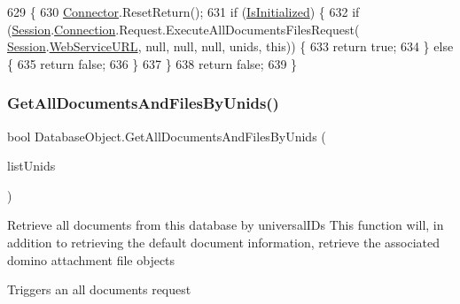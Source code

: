 \begin{DoxyCode}
629                                                              \{
630         \mbox{\hyperlink{class_connector}{Connector}}.ResetReturn();
631         \textcolor{keywordflow}{if} (\mbox{\hyperlink{class_database_object_a5fe036d32a30eb10d1b3f6a30263f740}{IsInitialized}}) \{
632             \textcolor{keywordflow}{if} (\mbox{\hyperlink{class_database_object_aa8484162b7d2a7c4c9426bca13c64c07}{Session}}.\mbox{\hyperlink{class_session_object_a014bdbf705a753540e19bfb53030c55c}{Connection}}.Request.ExecuteAllDocumentsFilesRequest(
      \mbox{\hyperlink{class_database_object_aa8484162b7d2a7c4c9426bca13c64c07}{Session}}.\mbox{\hyperlink{class_session_object_a697c071c812fbf7ad1166b896fb44c16}{WebServiceURL}}, null, null, null, unids, \textcolor{keyword}{this})) \{
633                 \textcolor{keywordflow}{return} \textcolor{keyword}{true};
634             \} \textcolor{keywordflow}{else} \{
635                 \textcolor{keywordflow}{return} \textcolor{keyword}{false};
636             \}
637         \}
638         \textcolor{keywordflow}{return} \textcolor{keyword}{false};
639     \}
\end{DoxyCode}
\mbox{\label{class_database_object_aa69262a50977a28a2decf400d1eedd20}} 
\subsubsection{\texorpdfstring{Get\+All\+Documents\+And\+Files\+By\+Unids()}{GetAllDocumentsAndFilesByUnids()}\hspace{0.1cm}{\footnotesize\ttfamily [2/2]}}
{\footnotesize\ttfamily bool Database\+Object.\+Get\+All\+Documents\+And\+Files\+By\+Unids (\begin{DoxyParamCaption}\item[{I\+List}]{list\+Unids }\end{DoxyParamCaption})}



Retrieve all documents from this database by universal\+I\+Ds This function will, in addition to retrieving the default document information, retrieve the associated domino attachment file objects 

Triggers an all documents request

